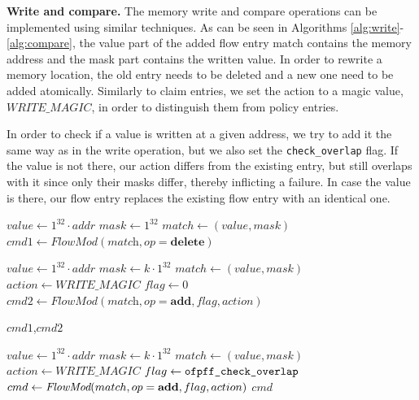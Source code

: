 \documentclass[conference]{sigcomm-alternate}
\newcommand{\concat}[0]{\cdot}
\newcommand{\compare}{compare\xspace}
\newcommand{\memwrite}{write\xspace}
\newcommand{\addr}{\textit{addr}\xspace}
\newcommand{\add}{\textbf{add}\xspace}
\newcommand{\dele}{\textbf{delete}\xspace}
\newcommand{\checko}{\texttt{check\_overlap}\xspace}
\newcommand{\ones}[1]{1^{#1}}
\newcommand{\memmagic}{\textit{WRITE\_MAGIC}}
\begin{document}
\vspace{1mm}
\noindent\textbf{Write and compare.}
The memory \memwrite and \compare
 operations can be implemented using similar techniques.
 As can be seen in Algorithms \ref{alg:write}-\ref{alg:compare},
  the value part of the added flow entry match contains the memory address and the mask part contains
  the written value. In order to rewrite a memory location, the old entry needs to be deleted and a new one need to be added atomically.
Similarly to claim entries, we set the action to a magic value, $\memmagic$, in order to distinguish them from policy entries.

In order to check if a value is written at a given address,
we try to add it the same way as in the \memwrite operation,
but we also set the \texttt{\checko} flag. If the value is not there,
our action differs from the existing entry, but still overlaps with it since only their masks differ,
thereby inflicting a failure.
In case the value is there, our flow entry replaces the existing flow entry
with an identical one.


\begin{algorithm}[t]
    \caption{$\textit{write}(\addr,k)$}
    \label{alg:write}
    \begin{algorithmic}[1]
    		\State $value \gets \ones{32}\concat\addr$
    		\State $mask \gets  \ones{32}$
    		\State $match \gets (value,mask)$
    		\State $\textit{cmd1}\gets \textit{FlowMod}(\textit{match}, op = \dele) $
    		
  		   \State $value \gets \ones{32}\concat\addr$
  		   \State $mask \gets  k\concat\ones{32}$
  		   \State $match \gets (value,mask)$
 		   \State $action \gets \memmagic$
 		   \State $flag \gets 0$
		   \State $\textit{cmd2}\gets \textit{FlowMod}(\textit{match}, op = \add, \textit{flag}, \textit{action}) $
		    		
			\Return $\textit{cmd1}$,$\textit{cmd2}$
    \end{algorithmic}
\end{algorithm}

\begin{algorithm}[t]
    \caption{$\textit{\compare}(\addr,k)$}
    \label{alg:compare}
    \begin{algorithmic}[1]
    		\State $value \gets \ones{32}\concat\addr$
    		\State $mask \gets  k\concat\ones{32}$
    		\State $match \gets (value,mask)$
    		\State $action \gets \memmagic$
    		\State $flag \gets \texttt{ofpff\_\checko}$
    		\State $cmd\gets \emph{FlowMod}(match, op = \add, flag, action) $
			\Return $cmd$
    \end{algorithmic}
\end{algorithm}
\end{document}
